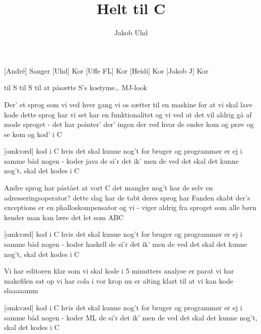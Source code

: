 \documentclass[a4paper]{article}
\title{Helt til C}
\author{Jakob Uhd}
\begin{document}
\maketitle

\begin{roles}
[Andr\'e] Sanger
[Uhd] Kor
[Uffe FL] Kor
[Heidi] Kor
[Jakob J] Kor
\end{roles}

\begin{props}
   til S
   til S
   til at påsætte S's kostyme\ldots{} MJ-look
\end{props}

\begin{song}

Der' et sprog
som vi ved
hver gang vi os sætter til
en maskine for at vi skal lave kode
dette sprog
har vi set
har en funktionalitet
og vi ved at det vil aldrig gå af mode
sproget - det har pointer'
der' ingen der ved hvor de ender
kom og prøv og se
kom og kod' i C

[omkvæd]
kod i C
hvis det skal kunne nog't
for bruger og programmør er ej i samme båd
nogen - koder java
de si'r det ik' men de ved det
skal det kunne nog't, skal det kodes i C

Andre sprog
har påstået
at vort C det mangler nog't
har de selv en adresseringsoperator?
dette slag
har de tabt
deres sprog har Fanden skabt
der's exceptions er en phalloskompensator
og vi - viger aldrig
fra sproget som alle børn kender
man kan lære det
let som ABC

[omkvæd]
kod i C
hvis det skal kunne nog't
for bruger og programmør er ej i samme båd
nogen - koder haskell
de si'r det ik' men de ved det
skal det kunne nog't, skal det kodes i C


Vi har editoren klar som vi skal kode i
5 minutters analyse er parat
vi har makefilen sat op
vi har cola i vor krop
nu er alting klart til at vi kan kode slaaaaamm

[omkvæd]
kod i C
hvis det skal kunne nog't
for bruger og programmør er ej i samme båd
nogen - koder ML
de si'r det ik' men de ved det
skal det kunne nog't, skal det kodes i C


\end{song}
\end{document}
